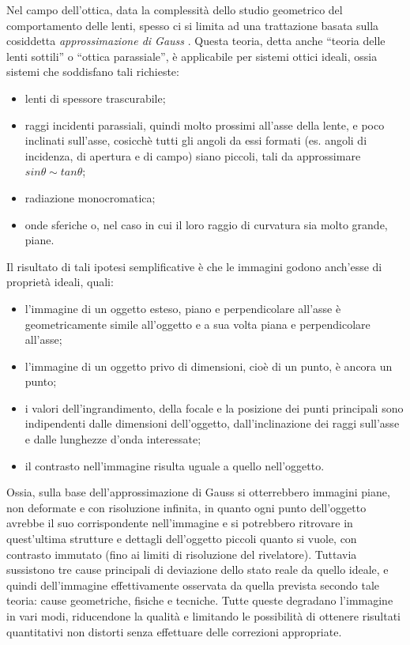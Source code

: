 Nel campo dell'ottica, data la complessità dello studio geometrico del comportamento delle lenti, spesso ci si limita ad una trattazione basata sulla cosiddetta \textit{approssimazione di Gauss} \cite{difetti}. 
Questa teoria, detta anche ``teoria delle lenti sottili'' o ``ottica parassiale'', è applicabile per sistemi ottici ideali, ossia sistemi che soddisfano tali richieste:

\begin{itemize}
\item lenti di spessore trascurabile;

\item raggi incidenti parassiali, quindi molto prossimi all'asse della lente, e poco inclinati sull'asse, cosicchè tutti gli angoli da essi formati (es. angoli di incidenza, di apertura e di campo) siano piccoli, tali da approssimare $sin\theta \sim tan\theta$;

\item radiazione monocromatica;

\item onde sferiche o, nel caso in cui il loro raggio di curvatura  sia molto grande, piane.
\end{itemize}

Il risultato di tali ipotesi semplificative è che le immagini godono anch'esse di proprietà ideali, quali:

\begin{itemize}
\item l'immagine di un oggetto esteso, piano e perpendicolare all'asse è geometricamente simile all'oggetto e a sua volta piana e perpendicolare all'asse;

\item l'immagine di un oggetto privo di dimensioni, cioè di un punto, è ancora un punto;

\item i valori dell'ingrandimento, della focale e la posizione dei punti principali sono indipendenti dalle dimensioni dell'oggetto, dall'inclinazione dei raggi sull'asse e dalle lunghezze d'onda interessate;

\item il contrasto nell'immagine risulta uguale a quello nell'oggetto.
\end{itemize}

Ossia, sulla base dell'approssimazione di Gauss si otterrebbero immagini piane, non deformate e con risoluzione infinita, in quanto ogni punto dell'oggetto avrebbe il suo corrispondente nell'immagine e si potrebbero ritrovare in quest'ultima strutture e dettagli dell'oggetto piccoli quanto si vuole, con contrasto immutato (fino ai limiti di risoluzione del rivelatore).
Tuttavia sussistono tre cause principali di deviazione dello stato reale da quello ideale, e quindi dell'immagine effettivamente osservata da quella prevista secondo tale teoria: cause geometriche, fisiche e tecniche.
Tutte queste degradano l'immagine in vari modi, riducendone la qualità e limitando le possibilità di ottenere risultati quantitativi non distorti senza effettuare delle correzioni appropriate.

